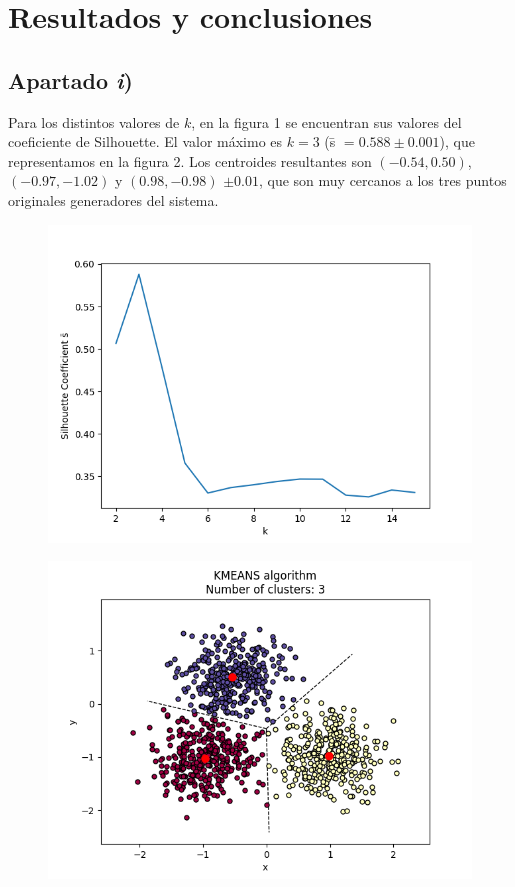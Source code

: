 \documentclass[a4paper]{article}
\begin{document}
	\section{Resultados y conclusiones}
	
	\subsection{Apartado \textit{i})}
	Para los distintos valores de $k$, en la figura 1 se encuentran sus valores del coeficiente de Silhouette. El valor máximo es $k=3$ (\={s} $=0.588\pm 0.001$), que representamos en la figura 2. Los centroides resultantes son $(-0.54,0.50)$, $(-0.97,-1.02)$ y $(0.98,-0.98)$ $\pm 0.01$, que son muy cercanos a los tres puntos originales generadores del sistema.
	
	\begin{figure}[h!]\centering
\begin{minipage}{.4\textwidth}\label{fig:1}
	\includegraphics[width=\linewidth]{Figure_1}
	\end{minipage}\qquad
\begin{minipage}{.4\textwidth}\label{fig:2}
	\includegraphics[width=\linewidth]{Figure_2}
	\end{minipage}
	\end{figure}
\end{document}

